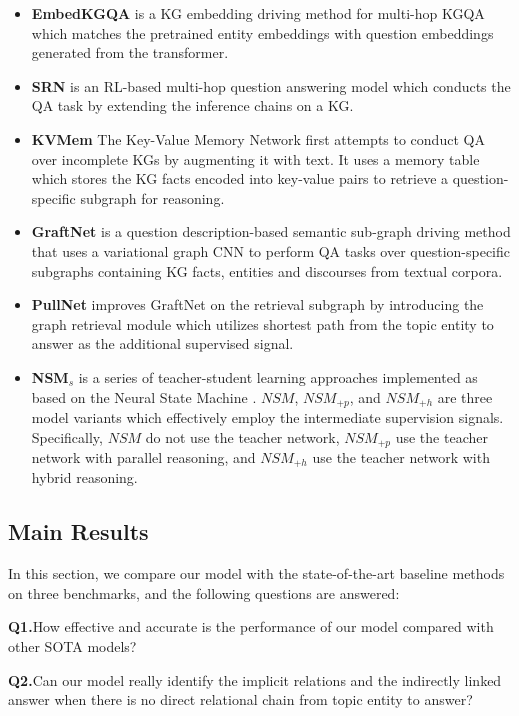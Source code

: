 \documentclass[pdflatex,sn-mathphys]{sn-jnl}%
\theoremstyle{thmstyleone}%
\theoremstyle{thmstyletwo}%
\theoremstyle{thmstylethree}%
\begin{document}
\begin{itemize}
\item \textbf{EmbedKGQA} \cite{apoorv2020embedKGQA} is a KG embedding driving method for multi-hop KGQA which matches the pretrained entity embeddings with question embeddings generated from the transformer.
\item \textbf{SRN} \cite{srn} is an RL-based multi-hop question answering model which conducts the QA task by extending the inference chains on a KG.
\item \textbf{KVMem} \cite{kvmem} The Key-Value Memory Network first attempts to conduct QA over incomplete KGs by augmenting it with text. It uses a memory table which stores the KG facts encoded into key-value pairs to retrieve a question-specific subgraph for reasoning. 
\item \textbf{GraftNet} \cite{sun2018graftnet} is a question description-based semantic sub-graph driving method that uses a variational graph CNN to perform QA tasks over question-specific subgraphs containing KG facts, entities and discourses from textual corpora.
\item \textbf{PullNet} \cite{pullnet} improves GraftNet on the retrieval subgraph by introducing the graph retrieval module which utilizes shortest path from the topic entity to answer as the additional supervised signal.
\item \textcolor[rgb]{1,0,0}{\textbf{NSM}$_{s}$ \cite{he2021stu-teaQA} is a series of teacher-student learning approaches implemented as based on the Neural State Machine \cite{nsm}. $NSM$, $NSM_{+p}$, and $NSM_{+h}$ are three model variants which effectively employ the intermediate supervision signals. Specifically, $NSM$ do not use the teacher network, $NSM_{+p}$ use the teacher network with parallel reasoning, and $NSM_{+h}$ use the teacher network with hybrid reasoning.}
\end{itemize}

\subsection{Main Results}
In this section, we compare our model with the state-of-the-art baseline methods on three benchmarks, and the following questions are answered:

\textbf{Q1.}\quad How effective and accurate is the performance of our model compared with other SOTA models?

\textbf{Q2.}\quad Can our model really identify the implicit relations and the indirectly linked answer when there is no direct relational chain from topic entity to answer?
\end{document}
